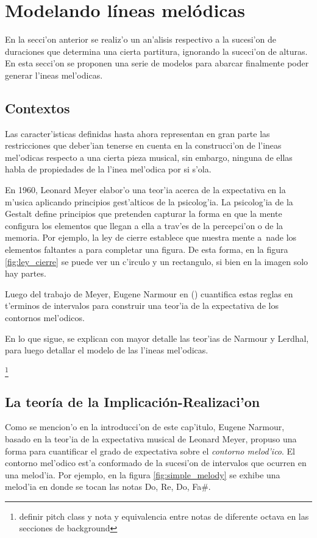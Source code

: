 \section{Modelando l\'ineas mel\'odicas}
En la secci'on anterior se realiz'o un an'alisis respectivo a la sucesi'on de duraciones que determina una cierta partitura, ignorando la 
suceci'on de alturas. En esta secci'on se proponen una serie de modelos para abarcar finalmente poder generar l'ineas mel'odicas.

\subsection{Contextos}
Las caracter'isticas definidas hasta ahora representan en gran parte las restricciones que deber'ian tenerse en cuenta en la construcci'on 
de l'ineas mel'odicas respecto a una cierta pieza musical, sin embargo, ninguna de ellas habla de propiedades de la l'inea mel'odica por si s'ola.

En 1960, Leonard Meyer elabor'o una teor'ia acerca de la expectativa en la m'usica aplicando principios gest'alticos de la psicolog'ia. La 
psicolog'ia de la Gestalt define principios que pretenden capturar la forma en que la mente configura los elementos que llegan a ella a trav'es 
de la percepci'on o de la memoria. Por ejemplo, la ley de cierre establece que nuestra mente a~nade los elementos faltantes a para completar una 
figura. De esta forma, en la figura \ref{fig:ley_cierre} se puede ver un c'irculo y un rectangulo, si bien en la imagen solo hay partes.

\begin{imagen}
    \width{6cm}
\end{imagen}

Luego del trabajo de Meyer, Eugene Narmour en (\cita) cuantifica estas reglas en t'erminos de intervalos para construir una teor'ia de 
la expectativa de los contornos mel'odicos. 

En lo que sigue, se explican con mayor detalle las teor'ias de Narmour y Lerdhal, para luego detallar el modelo de las l'ineas mel'odicas.


\footnote{definir pitch class y nota y equivalencia entre notas de diferente octava en las secciones de background} 

\subsection{La teor\'ia de la Implicaci\'on-Realizaci'on}
Como se mencion'o en la introducci'on de este cap'itulo, Eugene Narmour, basado en la teor'ia de la expectativa musical de Leonard Meyer, propuso una forma para cuantificar
el grado de expectativa sobre el \emph{contorno melod'ico}. El contorno mel'odico est'a conformado de la sucesi'on de intervalos que ocurren en una melod'ia. Por ejemplo, 
en la figura \ref{fig:simple_melody} se exhibe una melod'ia en donde se tocan las notas Do, Re, Do, Fa\#. 

